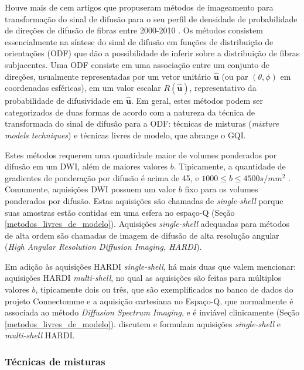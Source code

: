 \documentclass[
    12pt,                %
    oneside,            %
    a4paper,            %
    english,            %
    french,                %
    spanish,            %
    brazil                %
    ]{abntex2}
\begin{document}
Houve mais de cem artigos que propuseram métodos de imageamento para transformação do sinal de difusão para o seu perfil de densidade de probabilidade de direções de difusão de fibras entre 2000-2010 \cite{descoteaux2015}. Os métodos consistem essencialmente na síntese do sinal de difusão em funções de distribuição de orientações (ODF) que dão a possibilidade de inferir sobre a distribuição de fibras subjacentes. Uma ODF consiste em uma associação entre um conjunto de direções, usualmente representadas por um vetor unitário $\mathbf{\hat{u}}$ (ou par $(\theta, \phi)$ em coordenadas esféricas), em um valor escalar $R(\mathbf{\hat{u}})$, representativo da probabilidade de difusividade em $\mathbf{\hat{u}}$. Em geral, estes métodos podem ser categorizados de duas formas de acordo com a natureza da técnica de transformada do sinal de difusão para a ODF: técnicas de misturas (\textit{mixture models techniques}) e técnicas livres de modelo, que abrange o GQI.

Estes métodos requerem uma quantidade maior de volumes ponderados por difusão em um DWI, além de maiores valores $b$. Tipicamente, a quantidade de gradientes de ponderação por difusão é acima de 45, e $1000 \leq b \leq 4500s/mm^2$ \cite{descoteaux2015}. Comumente, aquisições DWI possuem um valor $b$ fixo para os volumes ponderados por difusão. Estas aquisições são chamadas de \textit{single-shell} porque suas amostras estão contidas em uma esfera no espaço-Q (Seção \ref{metodos_livres_de_modelo}). Aquisições \textit{single-shell} adequadas para métodos de alta ordem são chamadas de imagem de difusão de alta resolução angular (\textit{High Angular Resolution Diffusion Imaging, HARDI}).

Em adição às aquisições HARDI \textit{single-shell}, há mais duas que valem mencionar: aquisições HARDI \textit{multi-shell}, no qual as aquisições são feitas para múltiplos valores $b$, tipicamente dois ou três, que são exemplificados no banco de dados do projeto Connectomme \cite{essen2012} e a aquisição cartesiana no Espaço-Q, que normalmente é associada ao método \textit{Diffusion Spectrum Imaging}, e é inviável clinicamente (Seção \ref{metodos_livres_de_modelo}).  discutem e formulam aquisições \textit{single-shell} e \textit{multi-shell} HARDI.


\subsubsection{Técnicas de misturas}
\end{document}
